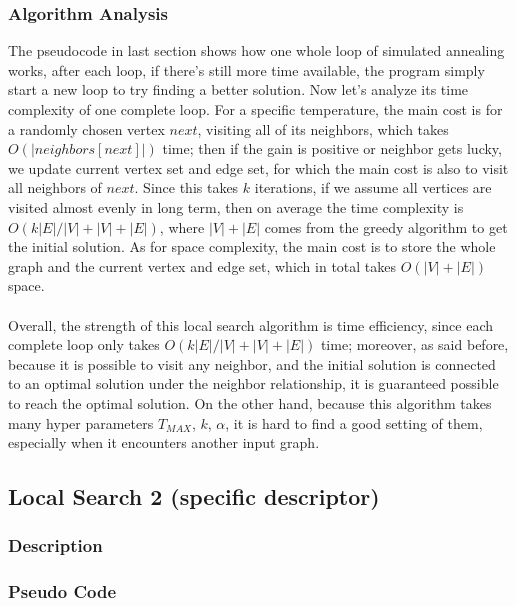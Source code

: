 \documentclass[acmlarge]{acmart}
\begin{document}
\subsubsection{Algorithm Analysis}

The pseudocode in last section shows how one whole loop of simulated annealing works, after each loop, if there's still more time available, the program simply start a new loop to try finding a better solution. Now let's analyze its time complexity of one complete loop. For a specific temperature, the main cost is for a randomly chosen vertex $next$, visiting all of its neighbors, which takes $O(|neighbors[next]|)$ time; then if the gain is positive or neighbor gets lucky, we update current vertex set and edge set, for which the main cost is also to visit all neighbors of $next$. Since this takes $k$ iterations, if we assume all vertices are visited almost evenly in long term, then on average the time complexity is $O(k|E|/|V| + |V| + |E|)$, where $|V|+|E|$ comes from the greedy algorithm to get the initial solution. As for space complexity, the main cost is to store the whole graph and the current vertex and edge set, which in total takes $O(|V|+|E|)$ space.\\\\

Overall, the strength of this local search algorithm is time efficiency, since each complete loop only takes $O(k|E|/|V| + |V| + |E|)$ time; moreover, as said before, because it is possible to visit any neighbor, and the initial solution is connected to an optimal solution under the neighbor relationship, it is guaranteed possible to reach the optimal solution. On the other hand, because this algorithm takes many hyper parameters $T_{MAX}$, $k$, $\alpha$, it is hard to find a good setting of them, especially when it encounters another input graph.

\subsection{Local Search 2 (specific descriptor)}

\subsubsection{Description}

\lipsum[1]

\subsubsection{Pseudo Code}
\end{document}
